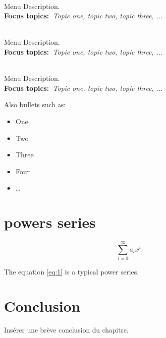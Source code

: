   \begin{description}\addtolength{\itemsep}{-0.35\baselineskip}%
    \item[\textbullet~\bfseries Menu Item] \hfill \\%
      Menu Description.~\\%
      {\textbf{Focus topics:~}\emph{Topic one, topic two, topic three, ...}}%
    \item[\textbullet~\bfseries Menu Item] \hfill \\%
      Menu Description.~\\%
      {\textbf{Focus topics:~}\emph{Topic one, topic two, topic three, ...}}%
    \item[\textbullet~\bfseries Menu Item] \hfill \\%
      Menu Description.~\\%
      {\textbf{Focus topics:~}\emph{Topic one, topic two, topic three, ...}}%
  \end{description}

  Also bullets such as:%
  \begin{itemize}\addtolength{\itemsep}{-0.35\baselineskip}%
    \item One%
    \item Two%
    \item Three%
    \item Four%
    \item \ldots%
  \end{itemize}%
\section{powers series} \label{subsection}

\begin{equation} \label{eq:1}
\sum_{i=0}^{\infty} a_i x^i
\end{equation}

The equation \ref{eq:1} is a typical power series.

\section*{Conclusion}

Insérer une brève conclusion du chapitre. 
